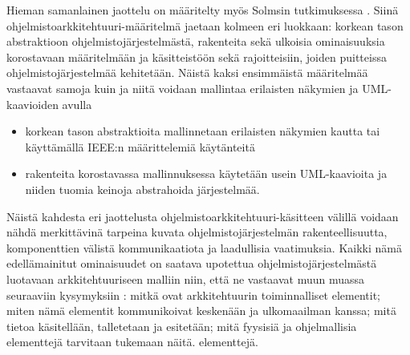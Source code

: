 \documentclass[finnish]{tktltiki2}
\numberwithin{table}{section}
\theoremstyle{definition}
\theoremstyle{remark}
\begin{document}
Hieman samanlainen jaottelu on määritelty myös Solmsin tutkimuksessa \citep{solms_what_2012}. Siinä ohjelmistoarkkitehtuuri-määritelmä jaetaan kolmeen eri luokkaan: korkean tason abstraktioon ohjelmistojärjestelmästä, rakenteita sekä ulkoisia ominaisuuksia korostavaan määritelmään ja käsitteistöön sekä rajoitteisiin, joiden puitteissa ohjelmistojärjestelmää kehitetään. Näistä kaksi ensimmäistä määritelmää vastaavat samoja kuin \cite{gorton_understanding_2011} ja niitä voidaan mallintaa erilaisten näkymien ja UML-kaavioiden avulla

\begin{itemize}
	\item korkean tason abstraktioita mallinnetaan erilaisten näkymien kautta tai käyttämällä IEEE:n määrittelemiä käytänteitä
	\item rakenteita korostavassa mallinnuksessa käytetään usein UML-kaavioita ja niiden tuomia keinoja abstrahoida järjestelmää.
	
\end{itemize}




Näistä kahdesta eri jaottelusta ohjelmistoarkkitehtuuri-käsitteen välillä voidaan nähdä merkittävinä tarpeina kuvata ohjelmistojärjestelmän rakenteellisuutta, komponenttien välistä kommunikaatiota ja laadullisia vaatimuksia. Kaikki nämä edellämainitut ominaisuudet on saatava  upotettua ohjelmistojärjestelmästä luotavaan arkkitehtuuriseen malliin niin, että ne vastaavat muun muassa seuraaviin kysymyksiin \citep[s. 31 - 33]{Rozanski:2011:SSA:2072649}: mitkä ovat arkkitehtuurin toiminnalliset elementit; miten nämä elementit kommunikoivat keskenään ja ulkomaailman kanssa; mitä tietoa käsitellään, talletetaan ja esitetään; mitä fyysisiä ja ohjelmallisia elementtejä tarvitaan tukemaan näitä. elementtejä.
\end{document}

